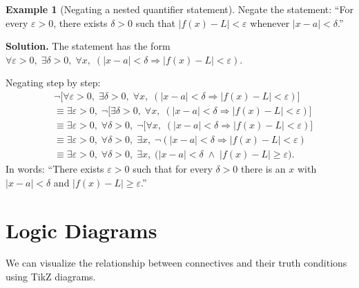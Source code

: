 \documentclass[12pt,a4paper,openany]{book}
\theoremstyle{definition}
\newtheorem{example}[definition]{Example}
\theoremstyle{plain}
\theoremstyle{remark}
\newcommand{\abs}[1]{\left|#1\right|}
\begin{document}
\begin{example}[Negating a nested quantifier statement]
\label{ex:negate-nested}
Negate the statement: ``For every $\varepsilon > 0$, there exists $\delta > 0$ such
that $\abs{f(x) - L} < \varepsilon$ whenever $\abs{x - a} < \delta$.''

\medskip\noindent
\textbf{Solution.} The statement has the form
$\forall \varepsilon > 0,\; \exists \delta > 0,\; \forall x,\;
(\abs{x-a} < \delta \Rightarrow \abs{f(x)-L} < \varepsilon)$.

Negating step by step:
\begin{align*}
&\lnot\bigl[\forall \varepsilon > 0,\; \exists \delta > 0,\; \forall x,\;
(\abs{x-a} < \delta \Rightarrow \abs{f(x)-L} < \varepsilon)\bigr] \\
&\equiv \exists \varepsilon > 0,\; \lnot\bigl[\exists \delta > 0,\; \forall x,\;
(\abs{x-a} < \delta \Rightarrow \abs{f(x)-L} < \varepsilon)\bigr] \\
&\equiv \exists \varepsilon > 0,\; \forall \delta > 0,\;
\lnot\bigl[\forall x,\; (\abs{x-a} < \delta \Rightarrow \abs{f(x)-L} < \varepsilon)\bigr] \\
&\equiv \exists \varepsilon > 0,\; \forall \delta > 0,\; \exists x,\;
\lnot(\abs{x-a} < \delta \Rightarrow \abs{f(x)-L} < \varepsilon) \\
&\equiv \exists \varepsilon > 0,\; \forall \delta > 0,\; \exists x,\;
\bigl(\abs{x-a} < \delta \;\land\; \abs{f(x)-L} \geq \varepsilon\bigr).
\end{align*}
In words: ``There exists $\varepsilon > 0$ such that for every $\delta > 0$ there
is an $x$ with $\abs{x-a} < \delta$ and $\abs{f(x)-L} \geq \varepsilon$.''
\end{example}

\section{Logic Diagrams}
\label{sec:logic-diagrams}

We can visualize the relationship between connectives and their truth conditions
using TikZ diagrams.
\end{document}
